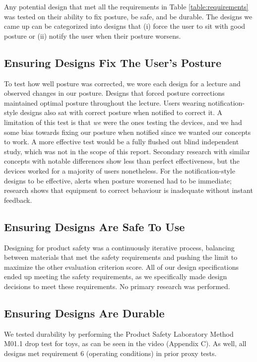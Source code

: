 \documentclass[11pt]{article}
\begin{document}
\label{section:keyRequirements}
Any potential design that met all the requirements in Table \ref{table:requirements} was tested on their ability to fix posture, be safe, and be durable. The designs we came up can be categorized into designs that (i) force the user to sit with good posture or (ii) notify the user when their posture worsens.

\subsection{Ensuring Designs Fix The User's Posture}

To test how well posture was corrected, we wore each design for a lecture and observed changes in our posture. Designs that forced posture corrections maintained optimal posture throughout the lecture. Users wearing notification-style designs also sat with correct posture when notified to correct it. A limitation of this test is that \textit{we} were the ones testing the devices, and we had some bias towards fixing our posture when notified since we wanted our concepts to work. A more effective test would be a fully flushed out blind independent study, which was not in the scope of this report. Secondary research with similar concepts with notable differences \cite{RefWorks:70} show less than perfect effectiveness, but the devices worked for a majority of users nonetheless. For the notification-style designs to be effective, alerts when posture worsened had to be immediate; research shows that equipment to correct behaviour is inadequate without instant feedback.

\subsection{Ensuring Designs Are Safe To Use} 

Designing for product safety was a continuously iterative process, balancing between materials that met the safety requirements and pushing the limit to maximize the other evaluation criterion score. All of our design specifications ended up meeting the safety requirements, as we specifically made design decisions to meet these requirements. No primary research was performed.

\subsection{Ensuring Designs Are Durable}

We tested durability by performing the Product Safety Laboratory Method M01.1 drop test for toys, as can be seen in the video (Appendix C). As well, all designs met requirement 6 (operating conditions) in prior proxy tests.
\end{document}
